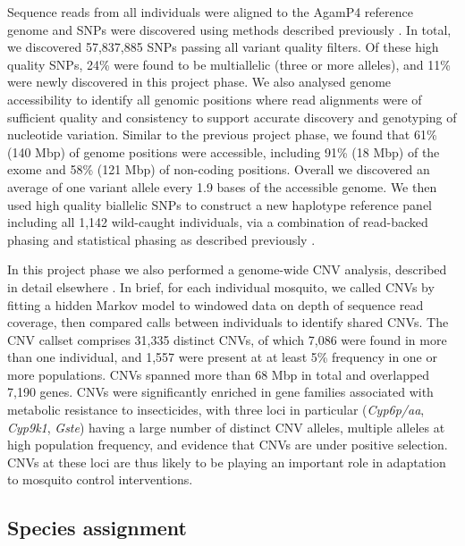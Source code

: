 \documentclass[a4paper,11pt,abstracton,hidelinks]{scrartcl}
\begin{document}
%
Sequence reads from all individuals were aligned to the AgamP4 reference genome \cite{Holt2002, sharakhova2007update} and SNPs were discovered using methods described previously \cite{Ag1000G2017}.
%
In total, we discovered 57,837,885 SNPs passing all variant quality filters. 
%
Of these high quality SNPs, 24\% were found to be multiallelic (three or more alleles), and 11\% were newly discovered in this project phase.
%
We also analysed genome accessibility to identify all genomic positions where read alignments were of sufficient quality and consistency to support accurate discovery and genotyping of nucleotide variation.
%
Similar to the previous project phase, we found that 61\% (140 Mbp) of genome positions were accessible, including 91\% (18 Mbp) of the exome and 58\% (121 Mbp) of non-coding positions.
%
Overall we discovered an average of one variant allele every 1.9 bases of the accessible genome.
%
We then used high quality biallelic SNPs to construct a new haplotype reference panel including all 1,142 wild-caught individuals, via a combination of read-backed phasing and statistical phasing as described previously \cite{Ag1000G2017}. 


In this project phase we also performed a genome-wide CNV analysis, described in detail elsewhere \cite{Lucas2019a}.
%
In brief, for each individual mosquito, we called CNVs by fitting a hidden Markov model to windowed data on depth of sequence read coverage, then compared calls between individuals to identify shared CNVs.
%
The CNV callset comprises 31,335 distinct CNVs, of which 7,086 were found in more than one individual, and 1,557 were present at at least 5\% frequency in one or more populations.
%
CNVs spanned more than 68 Mbp in total and overlapped 7,190 genes.
%
CNVs were significantly enriched in gene families associated with metabolic resistance to insecticides, with three loci in particular (\textit{Cyp6p/aa}, \textit{Cyp9k1}, \textit{Gste}) having a large number of distinct CNV alleles, multiple alleles at high population frequency, and evidence that CNVs are under positive selection.
%
CNVs at these loci are thus likely to be playing an important role in adaptation to mosquito control interventions.


\subsection*{Species assignment}
\end{document}
